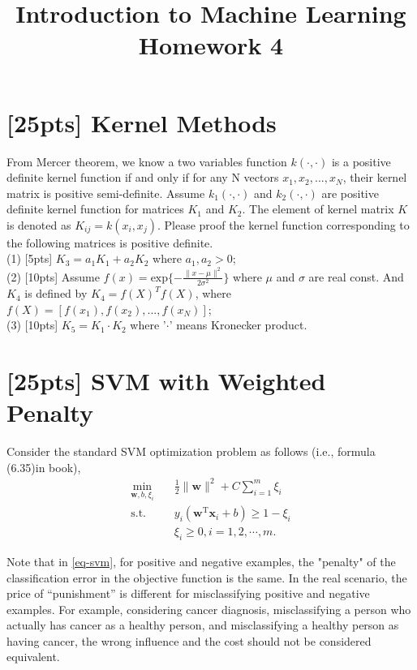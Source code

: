 \documentclass{article}
\title{Introduction to Machine Learning\\Homework 4}
\begin{document}
	\maketitle
	
	
\section{[25pts] Kernel Methods}
	From Mercer theorem, we know a two variables function $k(\cdot,\cdot)$ is a positive definite kernel function if and only if for any N vectors $x_1,x_2,...,x_N$, their kernel matrix is positive semi-definite. Assume $k_1(\cdot,\cdot)$ and $k_2(\cdot,\cdot)$ are positive definite kernel function for matrices $K_1$ and $K_2$. The element of kernel matrix $K$ is denoted as $K_{ij}=k(x_i,x_j)$. Please proof the kernel function corresponding to the following matrices is positive definite.\\
    (1) [5pts] $K_3=a_1 K_1+a_2 K_2$ where $a_1,a_2>0$;\\
    (2) [10pts] Assume $f(x)=\text{exp}\{-\frac{\|x-\mu\|^2}{2\sigma^2}\}$ where $\mu$ and $\sigma$ are real const. And $K_4$ is defined by $K_4=f(X)^T f(X)$, where $f(X)=[f(x_1),f(x_2),...,f(x_N)]$;\\
    (3) [10pts] $K_5=K_1\cdot K_2$ where '$\cdot$' means Kronecker product.\\
	
	
\newpage
	
	
    \section{[25pts] SVM with Weighted Penalty}
    Consider the standard SVM optimization problem as follows (i.e., formula (6.35)in book),
    \begin{equation}
    	\label{eq-svm}
    	\begin{split}
    		\min_{\mathbf{w},b,\xi_i}& \quad \frac{1}{2} \lVert \mathbf{w} \rVert^2 + C\sum_{i=1}^m\xi_i\\
    		\text{s.t.}&  \quad y_i(\mathbf{w}^\mathrm{T}\mathbf{x}_i + b)\geq 1-\xi_i\\
    		& \quad \xi_i \geq 0, i = 1,2,\cdots,m.
    	\end{split}
    \end{equation}

    Note that in \eqref{eq-svm}, for positive and negative examples, the "penalty" of the classification error in the objective function is the same. In the real scenario, the price of “punishment” is different for misclassifying positive and negative examples. For example, considering cancer diagnosis, misclassifying a person who actually has cancer as a healthy person, and misclassifying a healthy person as having cancer, the wrong influence and the cost should not be considered equivalent.
\end{document}
